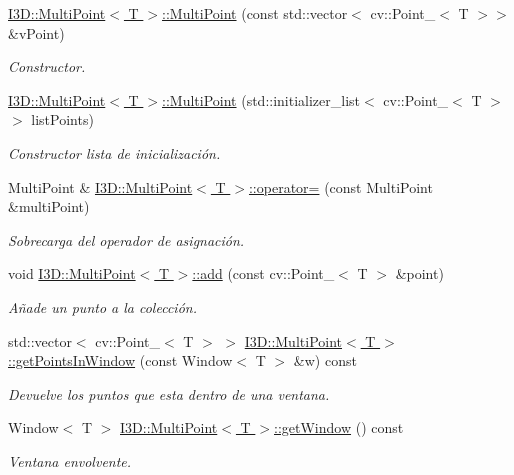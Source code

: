 \begin{DoxyCompactItemize}
\hyperlink{group___geometric_entities_ga4f8daff9e4ffbfcb5f1cc670f4e3681c}{I3\+D\+::\+Multi\+Point$<$ T $>$\+::\+Multi\+Point} (const std\+::vector$<$ cv\+::\+Point\+\_\+$<$ T $>$$>$ \&v\+Point)
\begin{DoxyCompactList}\small\item\em Constructor. \end{DoxyCompactList}\item 
\hyperlink{group___geometric_entities_ga5e9b29cc4e72496e3c0df560bcaf39d4}{I3\+D\+::\+Multi\+Point$<$ T $>$\+::\+Multi\+Point} (std\+::initializer\+\_\+list$<$ cv\+::\+Point\+\_\+$<$ T $>$$>$ list\+Points)
\begin{DoxyCompactList}\small\item\em Constructor lista de inicialización. \end{DoxyCompactList}\item 
Multi\+Point \& \hyperlink{group___geometric_entities_ga006fc08c663fc30e8f7f5dce0655bf96}{I3\+D\+::\+Multi\+Point$<$ T $>$\+::operator=} (const Multi\+Point \&multi\+Point)
\begin{DoxyCompactList}\small\item\em Sobrecarga del operador de asignación. \end{DoxyCompactList}\item 
void \hyperlink{group___geometric_entities_ga9199a5fd8948e1f456cb0a47f72f99b7}{I3\+D\+::\+Multi\+Point$<$ T $>$\+::add} (const cv\+::\+Point\+\_\+$<$ T $>$ \&point)
\begin{DoxyCompactList}\small\item\em Añade un punto a la colección. \end{DoxyCompactList}\item 
std\+::vector$<$ cv\+::\+Point\+\_\+$<$ T $>$ $>$ \hyperlink{group___geometric_entities_ga2985cb5eede5d9631f87d50aaec4ca5c}{I3\+D\+::\+Multi\+Point$<$ T $>$\+::get\+Points\+In\+Window} (const Window$<$ T $>$ \&w) const 
\begin{DoxyCompactList}\small\item\em Devuelve los puntos que esta dentro de una ventana. \end{DoxyCompactList}\item 
Window$<$ T $>$ \hyperlink{group___geometric_entities_ga25a83a5c3a0477ef6ee6c339cda6c4e7}{I3\+D\+::\+Multi\+Point$<$ T $>$\+::get\+Window} () const 
\begin{DoxyCompactList}\small\item\em Ventana envolvente. \end{DoxyCompactList}\item 

\end{DoxyCompactItemize}
